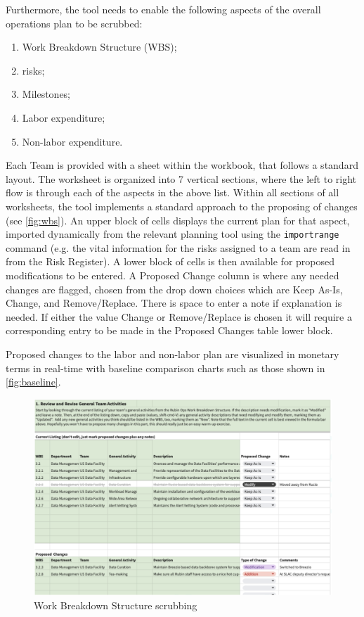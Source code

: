 \noindent Furthermore, the tool needs to enable the following aspects of the overall operations plan to be scrubbed:
\begin{enumerate}
\item Work Breakdown Structure (WBS);
\item risks;
\item Milestones;
\item Labor expenditure;
\item Non-labor expenditure.
\end{enumerate}
Each Team is provided with a sheet within the workbook, that follows a standard layout. 
The worksheet is organized into 7 vertical sections, where the left to right flow is through each of the aspects in the above list. 
Within all sections of all worksheets, the tool implements a standard approach to the proposing of changes (see \autoref{fig:wbs}).
An upper block of cells displays the current plan for that aspect, imported dynamically from the relevant planning tool using the \texttt{importrange} command (e.g. the vital information for the risks assigned to a team are read in from the Risk Register).
A lower block of cells is then available for proposed modifications to be entered.
A Proposed Change column is where any needed changes are flagged, chosen from the drop down choices which are Keep As-Is, Change, and Remove/Replace. 
There is space to enter a note if explanation is needed.
If either the value Change or Remove/Replace is chosen it will require a corresponding entry to be made in the Proposed Changes table lower block.

Proposed changes to the labor and non-labor plan are visualized in monetary terms in real-time with baseline comparison charts such as those shown in \autoref{fig:baseline}.



\begin{figure}[h!]
\begin{centering}
\includegraphics[width=1.0\textwidth]{Figure4WorkBreakdownStructurescrubbing}
	\caption{ Work Breakdown Structure scrubbing
\label{fig:wbs}}
\end{centering}
\end{figure}

